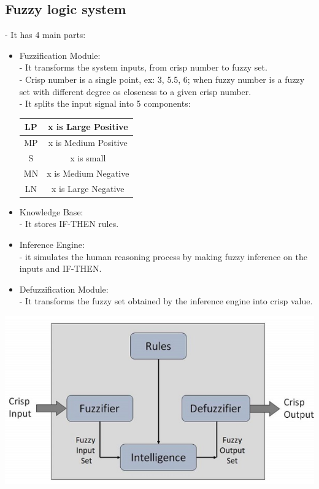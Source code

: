 \documentclass[12pt]{article}
\begin{document}
\subsection{Fuzzy logic system}
- It has 4 main parts: \\
\begin{itemize}
	\item Fuzzification Module: \\
	- It transforms the system inputs, from  crisp number to fuzzy set. \\
	- Crisp number is a single point, ex: 3, 5.5, 6; when fuzzy number is a fuzzy set with different degree os closeness to a given crisp number. \\
	- It splits the input signal into 5 components: \\
	\begin{tabular}{|c|c|}
	\hline
	LP & x is Large Positive \\
	\hline
	MP & x is Medium Positive \\
	\hline
	S & x is small \\
	\hline
	MN & x is Medium Negative \\
	\hline
	LN & x is Large Negative \\
	\hline
	\end{tabular}
	\bigbreak
	\item Knowledge Base: \\
	- It stores IF-THEN rules.
	\item Inference Engine: \\
	- it simulates the human reasoning process by making fuzzy inference on the inputs and IF-THEN.
	\item Defuzzification Module: \\
	- It transforms the fuzzy set obtained by the inference engine into crisp value.
\end{itemize}
\includegraphics[scale = 0.6]{hinh16}
\bigbreak
\end{document}
